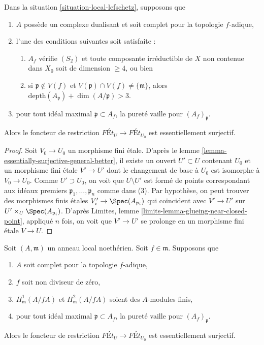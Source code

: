 \begin{lemma}
\label{lemma-equivalence-better}
Dans la situation \ref{situation-local-lefschetz}, supposons que
\begin{enumerate}
\item $A$ possède un complexe dualisant et soit complet pour la topologie $f$-adique,
\item l'une des conditions suivantes soit satisfaite :
\begin{enumerate}
\item $A_f$ vérifie $(S_2)$ et toute composante irréductible de $X$
non contenue dans $X_0$ soit de dimension $\geq 4$, ou bien
\item si $\mathfrak p \not \in V(f)$ et
$V(\mathfrak p) \cap V(f) \not = \{\mathfrak m\}$, alors
$\text{depth}(A_\mathfrak p) + \dim(A/\mathfrak p) > 3$.
\end{enumerate}
\item pour tout idéal maximal $\mathfrak p \subset A_f$,
la pureté vaille pour $(A_f)_\mathfrak p$.
\end{enumerate}
Alors le foncteur de restriction $\textit{F\'Et}_U \to \textit{F\'Et}_{U_0}$
est essentiellement surjectif.
\end{lemma}

\begin{proof}
Soit $V_0 \to U_0$ un morphisme fini étale. D'après le
lemme \ref{lemma-essentially-surjective-general-better},
il existe un ouvert $U' \subset U$ contenant $U_0$ et
un morphisme fini étale $V' \to U'$ dont le changement de base à $U_0$
est isomorphe à $V_0 \to U_0$. Comme $U' \supset U_0$,
on voit que $U \setminus U'$ est formé de points correspondant
aux idéaux premiers $\mathfrak p_1, \ldots, \mathfrak p_n$ comme dans (3).
Par hypothèse, on peut trouver des morphismes finis étales
$V'_i \to \Spec(A_{\mathfrak p_i})$ qui coïncident avec
$V' \to U'$ sur $U' \times_U \Spec(A_{\mathfrak p_i})$.
D'après Limites, lemme \ref{limits-lemma-glueing-near-closed-point},
appliqué $n$ fois, on voit que $V' \to U'$ se prolonge en un morphisme fini étale
$V \to U$.
\end{proof}

\begin{lemma}
\label{lemma-equivalence}
Soit $(A, \mathfrak m)$ un anneau local noethérien.
Soit $f \in \mathfrak m$. Supposons que
\begin{enumerate}
\item $A$ soit complet pour la topologie $f$-adique,
\item $f$ soit non diviseur de zéro,
\item $H^1_\mathfrak m(A/fA)$ et $H^2_\mathfrak m(A/fA)$ soient des
$A$-modules finis,
\item pour tout idéal maximal $\mathfrak p \subset A_f$,
la pureté vaille pour $(A_f)_\mathfrak p$.
\end{enumerate}
Alors le foncteur de restriction $\textit{F\'Et}_U \to \textit{F\'Et}_{U_0}$
est essentiellement surjectif.
\end{lemma}

